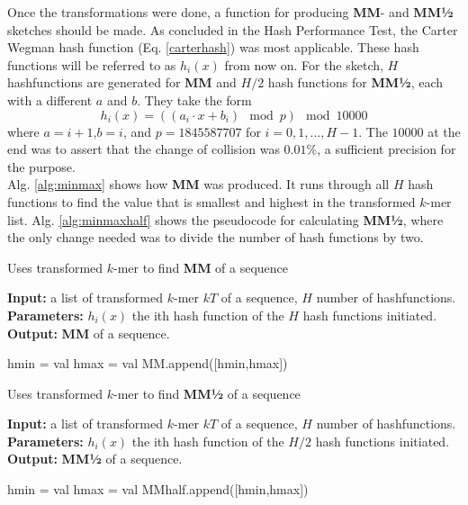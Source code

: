 \documentclass[../../main.tex]{subfiles}
\begin{document}
Once the transformations were done, a function for producing {\bf MM}- and {\bf MM½} sketches should be made. As concluded in the Hash Performance Test, the Carter Wegman hash function (Eq. \ref{carterhash}) was most applicable. These hash functions will be referred to as $h_i(x)$ from now on. For the sketch, $H$ hashfunctions are generated for {\bf MM} and $H/2$ hash functions for {\bf MM½}, each with a different $a$ and $b$. They take the form 
$$
h_i(x)=((a_i\cdot x + b_i) \mod p )\mod 10000
$$
where $a=i+1$,$b=i$, and $p=1845587707$ for $i=0,1,...,H-1$. The $10000$ at the end was to assert that the change of collision was $0.01\%$, a sufficient precision for the purpose.\\

Alg. \ref{alg:minmax} shows how {\bf MM} was produced. It runs through all $H$ hash functions to find the value that is smallest and highest in the transformed $k$-mer list. Alg. \ref{alg:minmaxhalf} shows the pseudocode for calculating {\bf MM½}, where the only change needed was to divide the number of hash functions by two.

\begin{algorithm}
\caption{Uses transformed $k$-mer to find {\bf MM} of a sequence}\label{alg:minmax}
\textbf{Input:} a list of transformed $k$-mer $kT$ of a sequence, $H$ number of hashfunctions.\\
\textbf{Parameters:} $h_i(x)$ the ith hash function of the $H$ hash functions initiated.\\
\textbf{Output:} {\bf MM} of a sequence.
\begin{algorithmic}[1]
\Statex
{}
				hmin = val
			\EndIf
				hmax = val
			\EndIf
		\EndFor
		\State MM.append([hmin,hmax])
	\EndFor
\State {}
\EndFunction
\end{algorithmic}
\end{algorithm}

\begin{algorithm}
\caption{Uses transformed $k$-mer to find {\bf MM½} of a sequence}\label{alg:minmaxhalf}
\textbf{Input:} a list of transformed $k$-mer $kT$ of a sequence, $H$ number of hashfunctions.\\
\textbf{Parameters:} $h_i(x)$ the ith hash function of the $H/2$ hash functions initiated.\\
\textbf{Output:} {\bf MM½} of a sequence.
\begin{algorithmic}[1]
\Statex
{}
				hmin = val
			\EndIf
				hmax = val
			\EndIf
		\EndFor
		\State MMhalf.append([hmin,hmax])
	\EndFor
\State {}
\EndFunction
\end{algorithmic}
\end{algorithm}
\end{document}
